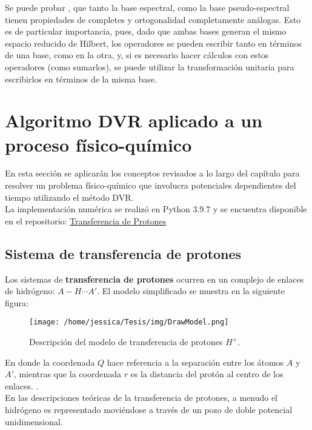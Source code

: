 Se puede probar \cite{Tannor:2006}, que tanto la base espectral, como la base pseudo-espectral tienen propiedades de completes y ortogonalidad completamente análogas. Esto es de particular importancia, pues, dado que ambas bases generan el mismo espacio reducido de Hilbert, los operadores se pueden escribir tanto en términos de una base, como en la otra, y, si es necesario hacer cálculos con estos operadores (como sumarlos), se puede utilizar la transformación unitaria para escribirlos en términos de la misma base.


\section{Algoritmo DVR aplicado a un proceso físico-químico}\label{sec:DVRapp}

En esta sección se aplicarán los conceptos revisados a lo largo del capítulo para resolver un problema físico-químico que involucra potenciales dependientes del tiempo utilizando el método \acs{DVR}.\\
La implementación numérica se realizó en Python 3.9.7 y se encuentra disponible en el repositorio: \href{https://github.com/Jessi-MM/PropagatorLearning/blob/main/src/ANN_as_Propagators_DidacticNotebook.ipynb}{\faGithub Transferencia de Protones}

\subsection{Sistema de transferencia de protones}\label{sec:ProtonTransfer}

Los sistemas de \textbf{transferencia de protones} ocurren en un complejo de enlaces de hidrógeno: $A-H\dotsb A'$. El modelo simplificado se muestra en la siguiente figura:

\begin{figure}[ht]
  \centering
\texttt{[image: /home/jessica/Tesis/img/DrawModel.png]}
\caption{Descripción del modelo de transferencia de protones $H^+$.}
\label{fig:drawmodel}
\end{figure}

En donde la coordenada $Q$ hace referencia a la separación entre los átomos $A$ y $A'$, mientras que la coordenada $r$ es la distancia del protón al centro de los enlaces. \cite{DynamicalTheoryPTS}. \\
En las descripciones teóricas de la transferencia de protones, a menudo el hidrógeno es representado moviéndose a través de un pozo de doble potencial unidimensional. \cite{Enzymes}
\\

